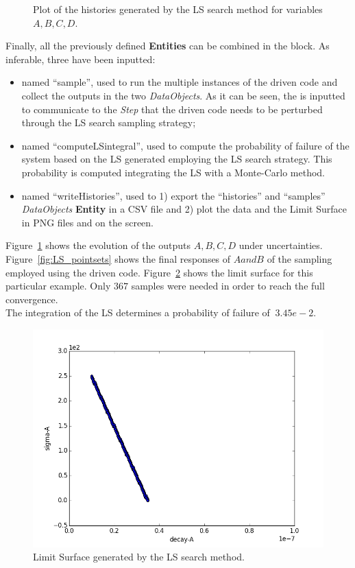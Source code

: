 \begin{enumerate}
\begin{figure}[h!]
  \caption{Plot of the histories generated by the LS search method for variables $A,B,C,D$.}
  \label{fig:LS_histories}
 \end{figure}
   Finally, all the previously defined \textbf{Entities} can be combined in
   the  block. As inferable,
   three  have been inputted:
   \begin{itemize}
     \item {} named ``sample'', used to run the multiple
     instances of the driven code and
     collect the outputs in the two \textit{DataObjects}. As it can be
     seen, the  is inputted to communicate to the
     \textit{Step} that the driven code needs to
     be perturbed through the LS search sampling strategy;
     \item {} named ``computeLSintegral'', used to
     compute the probability of failure of the system based on the LS generated employing the LS search strategy. This
     probability is computed integrating the LS with a Monte-Carlo
     method.
     \item  {} named ``writeHistories'', used to 1) export
     the ``histories'' and ``samples''  \textit{DataObjects}
     \textbf{Entity} in a CSV file and 2) plot the data and the Limit Surface
     in  PNG files and on the screen.
   \end{itemize}
\end{enumerate}
 Figure~\ref{fig:LS_histories}
 shows the evolution of the outputs $A,B,C,D$ under uncertainties.
 Figure~\ref{fig:LS_pointsets} shows the final responses  of $A and B$
 of the sampling employed using the driven code.
 Figure~\ref{fig:LSplot}  shows the limit surface for this particular
 example. Only $367$ samples were needed in order to reach the full
 convergence.
 \\The integration of the LS determines a probability of failure of
 $~3.45e-2$.
 \begin{figure}[h!]
  \centering
  \includegraphics[scale=0.7]{pics/LimitSurfacePlot.png}
  \caption{Limit Surface generated by the LS search method.}
  \label{fig:LSplot}
 \end{figure}








